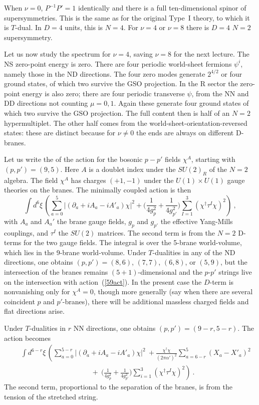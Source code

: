 \documentclass[12pt]{article}
\def\be{\begin{equation}}
\def\ee{\end{equation}}
\def\bea{\begin{eqnarray}}
\def\eea{\end{eqnarray}}
\def\apm{\alpha'}
\begin{document}
When $\nu = 0$, $P^{-1}P' = 1$ identically and there is a full
ten-dimensional spinor of supersymmetries.  This is the same as for the
original Type~I theory, to which it is $T$-dual.  In $D=4$ units, this is
$N=4$.  For $\nu=4$ or $\nu=8$ there is $D=4$ $N=2$ supersymmetry.

Let us now study the spectrum for $\nu = 4$, saving $\nu = 8$ for the next
lecture.  The NS zero-point energy is zero.  There are four periodic
world-sheet fermions $\psi^i$, namely those in the ND directions.  The four
zero modes generate $2^{4/2}$ or four ground states, of which two survive the
GSO projection.  In the R sector the zero-point energy is also zero; there are
four periodic transverse $\psi$, from the NN and DD directions not counting
$\mu=0,1$.  Again these generate four ground states of which two survive the
GSO projection.  The full content then is half of an $N=2$ hypermultiplet.
The other half comes from the world-sheet-orientation-reversed states: these
are distinct because for $\nu \neq 0$ the ends are always on different
D-branes.

Let us write the of the action for the bosonic $p-p'$ fields $\chi^A$,
starting with $(p,p') = (9,5)$.
Here $A$ is a doublet index under the $SU(2)_R$ of the $N=2$ algebra.  The
field $\chi^A$ has charges $(+1,-1)$ under the $U(1) \times U(1)$ gauge
theories on the branes.  The minimally coupled action
is then
\be
\int d^6\xi\, \left( \sum_{a=0}^5 \left| (\partial_a + iA_a - i A'_a) \chi
\right|^2 + 
\biggr(\frac{1}{4g_p^2} + \frac{1}{4g_{p'}^2} \biggl)
\sum_{I=1}^3 (\chi^{\dagger}\tau^I\chi)^2 \right)\ ,
\label{59act}
\ee
with $A_a$ and $A_a'$ the brane gauge fields, $g_p$ and $g_{p'}$ the
effective Yang-Mills couplings, and $\tau^I$ the $SU(2)$ matrices.  The second
term is from the
$N=2$ D-terms for the two gauge fields.  The integral is over the 5-brane
world-volume, which lies in the 9-brane world-volume.  Under $T$-dualities in
any of the ND directions, one obtains
$(p,p') = (8,6)$, $(7,7)$, $(6,8)$, or $(5,9)$, but the intersection of the
branes remains $(5+1)$-dimensional and the $p$-$p'$ strings live on the
intersection with action~(\ref{59act}).  In the present case the $D$-term is
nonvanishing only for $\chi^A = 0$, though more generally (say when there are
several coincident $p$ and $p'$-branes), there will be additional massless
charged fields and flat directions arise.

Under $T$-dualities in $r$ NN directions, one obtains $(p,p') = (9-r,5-r)$. 
The action becomes 
\bea
&&\int d^{6-r}\xi\, \left( \sum_{a=0}^{5-r} \left| (\partial_a + iA_a - i
A'_a) \chi
\right|^2\ + \frac{ \chi^{\dagger}\chi }{(2\pi\apm)^2 }
\sum_{a=6-r}^{5} ( X_a - X'_a )^2 \right.\nonumber\\
&&\qquad\qquad\qquad\qquad\qquad+\ 
\left.\biggl(\frac{1}{4g_p^2} + \frac{1}{4g_{p'}^2} \biggr)
\sum_{i=1}^3 (\chi^{\dagger}\tau^I\chi)^2 \right)\ .
\label{xyact}
\eea
The second term, proportional to the separation of the branes, is from the
tension of the stretched string.
\end{document}
